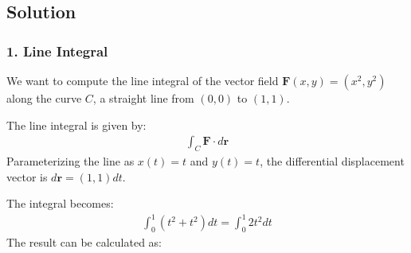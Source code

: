 \documentclass[letterpaper,10pt,english]{jupyterBook}
\begin{document}
\subsection{Solution}
\label{\detokenize{prerequisites:id12}}

\subsubsection{1. Line Integral}
\label{\detokenize{prerequisites:line-integral}}
\sphinxAtStartPar
We want to compute the line integral of the vector field \(\mathbf{F}(x, y) = (x^2, y^2)\) along the curve \(C\), a straight line from \((0, 0)\) to \((1, 1)\).

\sphinxAtStartPar
The line integral is given by:
\begin{equation*}
\begin{split}
\int_C \mathbf{F} \cdot d\mathbf{r}
\end{split}
\end{equation*}
\sphinxAtStartPar
Parameterizing the line as \(x(t) = t\) and \(y(t) = t\), the differential displacement vector is \(d\mathbf{r} = (1, 1) dt\).

\sphinxAtStartPar
The integral becomes:
\begin{equation*}
\begin{split}
\int_0^1 (t^2 + t^2) dt = \int_0^1 2t^2 dt
\end{split}
\end{equation*}
\sphinxAtStartPar
The result can be calculated as:
\end{document}
